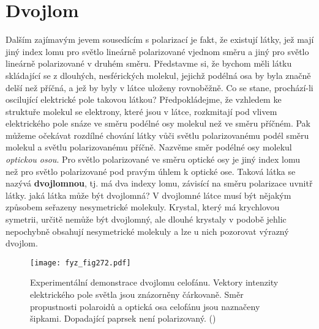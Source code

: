   \section{Dvojlom}\label{fyz:IchapXXXIIIsecIII}
    Dalším zajímavým jevem sousedícím s polarizací je fakt, že existují látky, jež mají jiný index
    lomu pro světlo lineárně polarizované vjednom směru a jiný pro světlo lineárně polarizované v
    druhém směru. Představme si, že bychom měli látku skládající se z dlouhých, nesférických
    molekul, jejichž podélná osa by byla značně delší než příčná, a jež by byly v látce uloženy
    rovnoběžně. Co se stane, prochází-li oscilující elektrické pole takovou látkou? Předpokládejme,
    že vzhledem ke struktuře molekul se elektrony, které jsou v látce, rozkmitají pod vlivem
    elektrického pole snáze ve směru podélné osy molekul než ve směru příčném. Pak můžeme očekávat
    rozdílné chování látky vůči světlu polarizovanému podél směru molekul a světlu polarizovanému
    příčně. Nazvěme směr podélné osy molekul \emph{optickou osou}. Pro světlo polarizované ve směru
    optické osy je jiný index lomu než pro světlo polarizované pod pravým úhlem k optické ose.
    Taková látka se nazývá \textbf{dvojlomnou}, tj. má dva indexy lomu, závisící na směru polarizace
    uvnitř látky. jaká látka může být dvojlomná? V dvojlomné látce musí být nějakým způsobem
    seřazeny nesymetrické molekuly. Krystal, který má krychlovou symetrii, určitě nemůže být
    dvojlomný, ale dlouhé krystaly v podobě jehlic nepochybně obsahují nesymetrické molekuly a lze u
    nich pozorovat výrazný dvojlom.

    \begin{figure}[ht!] %
      \centering
      \texttt{[image: fyz\_fig272.pdf]}
      \caption{Experimentální demonstrace dvojlomu celofánu. Vektory intenzity elektrického pole
               světla jsou znázorněny čárkovaně. Směr propustnosti polaroidů a optická osa celofánu
               jsou naznačeny šipkami. Dopadající paprsek není polarizovaný.
               (\cite[s.~427]{Feynman01})}
      \label{fyz:fig272}
    \end{figure}

